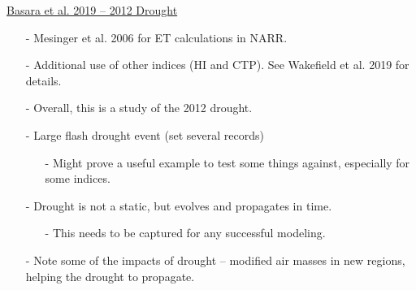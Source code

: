 \documentclass[12pt, letterpaper]{article}
\begin{document}
    \underline{Basara et al. 2019 -- 2012 Drought}
    \begin{itemize}
    	\item[-] Mesinger et al. 2006 for ET calculations in NARR.
    	\item[-] Additional use of other indices (HI and CTP). See Wakefield et al. 2019 for details.
    	\item[-] Overall, this is a study of the 2012 drought.
    	\item[-] Large flash drought event (set several records)
    	\begin{itemize}
    		\item[-] Might prove a useful example to test some things against, especially for some indices.
    	\end{itemize}
        \item[-] Drought is not a static, but evolves and propagates in time.
        \begin{itemize}
        	\item[-] This needs to be captured for any successful modeling.
        \end{itemize}
        \item[-] Note some of the impacts of drought -- modified air masses in new regions, helping the
                 drought to propagate.
    \end{itemize}
\end{document}

